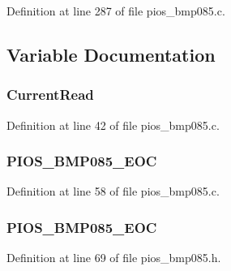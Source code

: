 Definition at line 287 of file pios\-\_\-bmp085.\-c.



\subsection{Variable Documentation}
\hypertarget{group___p_i_o_s___b_m_p085_ga1dd45e20832bd6d56c5bcc1b1773a204}{
\subsubsection[{Current\-Read}]{ Current\-Read}}\label{group___p_i_o_s___b_m_p085_ga1dd45e20832bd6d56c5bcc1b1773a204}


Definition at line 42 of file pios\-\_\-bmp085.\-c.

\hypertarget{group___p_i_o_s___b_m_p085_ga4dd7fe8ef562b12c78ad0cfc1bf1fd8e}{
\subsubsection[{P\-I\-O\-S\-\_\-\-B\-M\-P085\-\_\-\-E\-O\-C}]{ P\-I\-O\-S\-\_\-\-B\-M\-P085\-\_\-\-E\-O\-C}}\label{group___p_i_o_s___b_m_p085_ga4dd7fe8ef562b12c78ad0cfc1bf1fd8e}


Definition at line 58 of file pios\-\_\-bmp085.\-c.

\hypertarget{group___p_i_o_s___b_m_p085_ga4dd7fe8ef562b12c78ad0cfc1bf1fd8e}{
\subsubsection[{P\-I\-O\-S\-\_\-\-B\-M\-P085\-\_\-\-E\-O\-C}]{ P\-I\-O\-S\-\_\-\-B\-M\-P085\-\_\-\-E\-O\-C}}\label{group___p_i_o_s___b_m_p085_ga4dd7fe8ef562b12c78ad0cfc1bf1fd8e}


Definition at line 69 of file pios\-\_\-bmp085.\-h.


